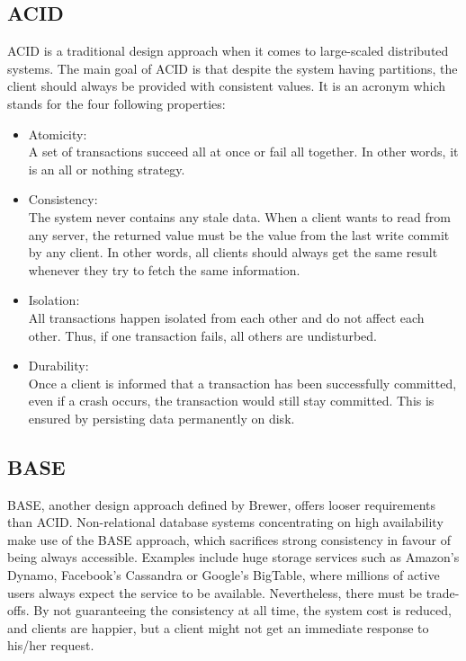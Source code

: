 \subsection{ACID}
\label{sec:background_acid}
ACID is a traditional design approach\cite{brewer2012cap} when it comes to large-scaled distributed systems. The main goal of ACID is that despite the system having partitions, the client should always be provided with consistent values. It is an acronym which stands for the four following properties:
\begin{itemize}
\item Atomicity:\\
A set of transactions succeed all at once or fail all together. In other words, it is an all or nothing strategy.
\item Consistency: \\
The system never contains any stale data. When a client wants to read from any server, the returned value must be the value from the last write commit by any client. In other words, all clients should always get the same result whenever they try to fetch the same information.
\item Isolation:\\
All transactions happen isolated from each other and do not affect each other. Thus, if one transaction fails, all others are undisturbed.
\item Durability:\\
Once a client is informed that a transaction has been successfully committed, even if a crash occurs, the transaction would still stay committed. This is ensured by persisting data permanently on disk.
\end{itemize} 

\subsection{BASE}
\label{sec:background_base}
BASE, another design approach defined by Brewer, offers looser requirements than ACID\cite{brewer2012cap}. Non-relational database systems concentrating on high availability make use of the BASE approach, which sacrifices strong consistency in favour of being always accessible. Examples include huge storage services such as Amazon's Dynamo, Facebook's Cassandra or Google's BigTable, where millions of active users always expect the service to be available. Nevertheless, there must be trade-offs. By not guaranteeing the consistency at all time, the system cost is reduced, and clients are happier, but a client might not get an immediate response to his/her request.

